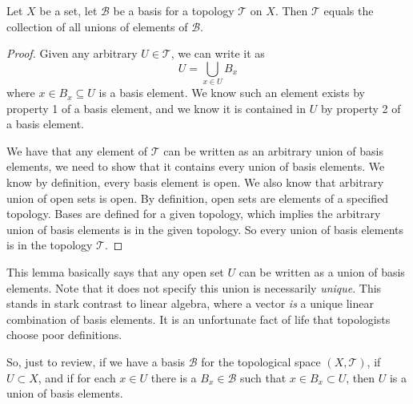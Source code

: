 \begin{lem}\label{lem:basisTopologyUnions}
  Let $X$ be a set, let $\mathscr{B}$ be a basis for a topology
  $\mathcal{T}$ on $X$. Then $\mathcal{T}$ equals the collection
  of all unions of elements of $\mathscr{B}$.
\end{lem}
\begin{proof}
Given any arbitrary $U\in\mathcal{T}$, we can write it as
\begin{equation}%
  U = \bigcup_{x\in U}B_{x}
\end{equation}
where $x\in B_{x}\subseteq U$ is a basis element. We know such an
element exists by property 1 of a basis element, and we know it
is contained in $U$ by property 2 of a basis element. 

We have that any element of $\mathcal{T}$ can be written as an
arbitrary union of basis elements, we need to show that it
contains every union of basis elements. We know by definition,
every basis element is open. We also know that arbitrary union of
open sets is open. By definition, open sets are elements of a specified
topology. Bases are defined for a given topology, which implies
the arbitrary union of basis elements is in the given
topology. So every union of basis elements is in the topology
$\mathcal{T}$.
\end{proof}
\begin{rmk}\label{rmk:basisNonuniqueness}
This lemma basically says that any open set $U$ can be written as
a union of basis elements. Note that it does not specify this
union is necessarily \emph{unique}. This stands in stark contrast
to linear algebra, where a vector \emph{is} a unique linear
combination of basis elements. It is an unfortunate fact of life
that topologists choose poor definitions.
\end{rmk}
\begin{rmk}
So, just to review, if we have a basis $\mathscr{B}$ for
the topological space $(X,\mathcal{T})$, if $U\subset X$, and if
for each $x\in U$ there is a $B_{x}\in\mathscr{B}$ such that
$x\in B_{x}\subset U$, then $U$ is a union of basis elements.
\end{rmk}
